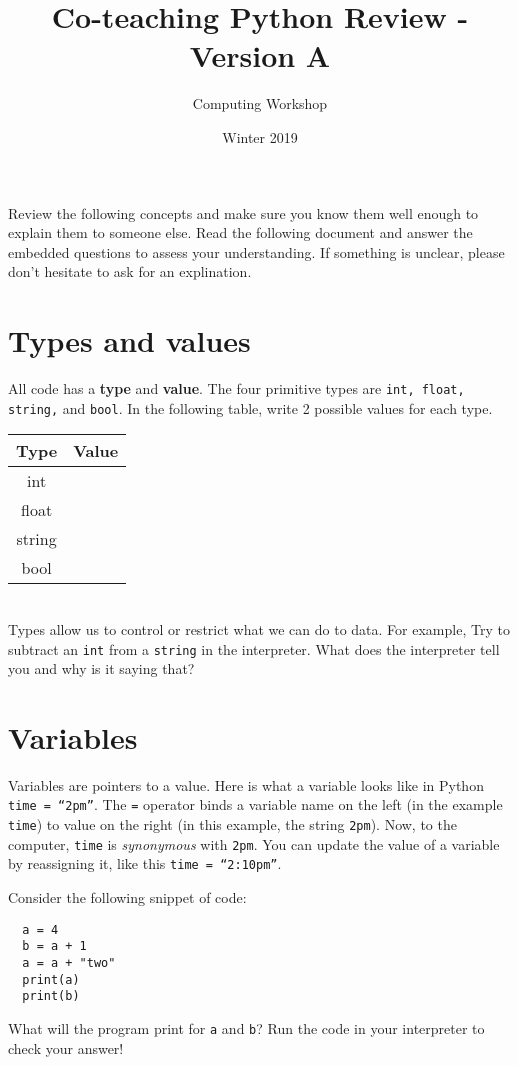 \documentclass[11pt]{article}
\author{Computing Workshop}
\title{Co-teaching Python Review - Version A}
\date{Winter 2019}
\begin{document}
\maketitle

Review the following concepts and make sure you know them well enough to explain them to someone else. Read the
following document and answer the embedded questions to assess your understanding. If something is unclear, please don't hesitate to ask for an explination.

\section*{Types and values}

All code has a \textbf{type} and \textbf{value}. The four primitive types are \texttt{int, float, string,} and
\texttt{bool}. In the following table, write 2 possible values for each type.
\\

\def\arraystretch{2}
\begin{tabular}{| c | p{34em}|} \hline
  Type & Value \\ \hline
  int & ~ \\ \hline
  float & ~ \\ \hline
  string & ~ \\ \hline
  bool & ~ \\ \hline
\end{tabular}
\\

Types allow us to control or restrict what we can do to data. For example, Try to subtract an \texttt{int} from a
\texttt{string} in the interpreter. What does the interpreter tell you and why is it saying that?

\section*{Variables}

Variables are pointers to a value. Here is what a variable looks like in Python \texttt{time = ``2pm''}. The \texttt{=}
operator binds a variable name on the left (in the example \texttt{time}) to value on the right (in this example, the
string \texttt{2pm}). Now, to the computer, \texttt{time} is \emph{synonymous} with \texttt{2pm}. You can update the
value of a variable by reassigning it, like this \texttt{time = ``2:10pm''}.

Consider the following snippet of code:
\begin{lstlisting}
  a = 4
  b = a + 1
  a = a + "two"
  print(a)
  print(b)
\end{lstlisting}

What will the program print for \texttt{a} and \texttt{b}? Run the code in your interpreter to check your answer!
\end{document}
